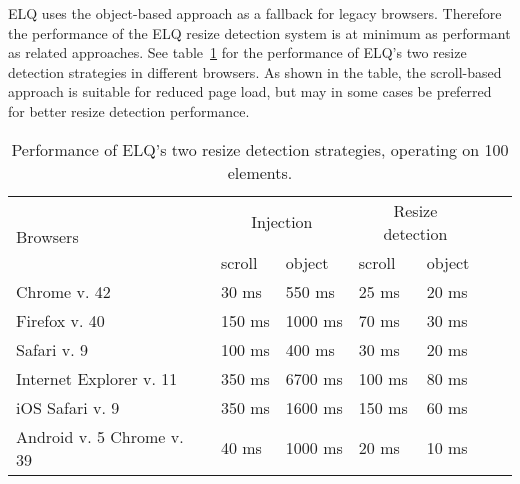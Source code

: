 \documentclass{acm_proc_article-sp}
\newcommand{\elq}{ELQ}
\begin{document}
    \elq{} uses the object-based approach as a fallback for legacy browsers.
    Therefore the performance of the \elq{} resize detection system is at minimum as performant as related approaches.
    See table~\ref{table:erd-layout-engines} for the performance of \elq{}'s two resize detection strategies in different browsers.
    As shown in the table, the scroll-based approach is suitable for reduced page load, but may in some cases be preferred for better resize detection performance.

    \begin{table}[ht]\center
      \tiny
      \begin{tabular}[t]{ l l l l l l l }
        \multirow{2}{*}{Browsers} & \multicolumn{2}{c}{Injection} & \multicolumn{2}{c}{Resize detection} \\
        & scroll & object & scroll & object \\
        \hline
        Chrome v. 42                & 30 ms   & 550 ms    & 25 ms    & 20 ms  \\
        Firefox v. 40               & 150 ms  & 1000 ms   & 70 ms    & 30 ms  \\
        Safari v. 9                 & 100 ms  & 400 ms    & 30 ms    & 20 ms  \\
        Internet Explorer v. 11     & 350 ms  & 6700 ms   & 100 ms   & 80 ms  \\
        iOS Safari v. 9             & 350 ms  & 1600 ms   & 150 ms   & 60 ms  \\
        Android v. 5 Chrome v. 39   & 40 ms   & 1000 ms  & 20 ms     & 10 ms  \\
      \end{tabular}
      \caption{Performance of \elq{}'s two resize detection strategies, operating on 100 elements.}
      \label{table:erd-layout-engines}
    \end{table}
\end{document}
